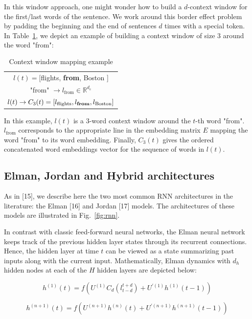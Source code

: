 In this window approach, one might wonder how to build a $d$-context window for
the first/last words of the sentence. We work around this border effect problem
by padding the beginning and the end of sentences $d$ times with a special token.
In Table~\ref{fig:cwmap}, we depict an example of building a context window of size $3$ around the
word "from":

\begin{table}
\centering
\begin{tabular}{c}
$l(t)=[$flights, {\bf from}, Boston $]$ \\
"from" $\rightarrow l_{\textrm{from}}\in\mathbb{R}^{d_e}$ \\
$l(t)\rightarrow C_{3}(t)=[l_{\textrm{flights}}, l_{\textrm{{\bf from}}}, l_{\textrm{Boston}}]$
\end{tabular}
\caption{
\label{fig:cwmap}
Context window mapping example}
\end{table}

In this example, $l(t)$ is a $3$-word context window around the $t$-th word
"from".  $l_{\textrm{from}}$ corresponds to the appropriate line in the
embedding matrix $E$ mapping the word "from" to its word embedding. Finally,
$C_3 (t)$ gives the ordered concatenated word embeddings vector for the
sequence of words in $l(t)$.

\subsection{Elman, Jordan and Hybrid architectures}

As in [15], we describe here the two most common RNN architectures in the
literature: the Elman [16] and Jordan [17] models. The architectures of these
models are illustrated in Fig.~\ref{fig:rnn}.

In contrast with classic feed-forward neural networks, the Elman neural network
keeps track of the previous hidden layer states through its recurrent
connections. Hence, the hidden layer at time $t$ can be viewed as a state
summarizing past inputs along with the current input. Mathematically, Elman
dynamics with $d_h$ hidden nodes at each of the $H$ hidden layers are depicted
below:

\begin{equation}
h^{(1)}(t) = f(U^{(1)}C_{d}(l_{t-d}^{t+d})+U^{'(1)}h^{(1)}(t-1))
\end{equation}

\begin{equation}
h^{(n+1)}(t) = f(U^{(n+1)}h^{(n)}(t) + U^{'(n+1)}h^{(n+1)}(t-1))
\end{equation}


